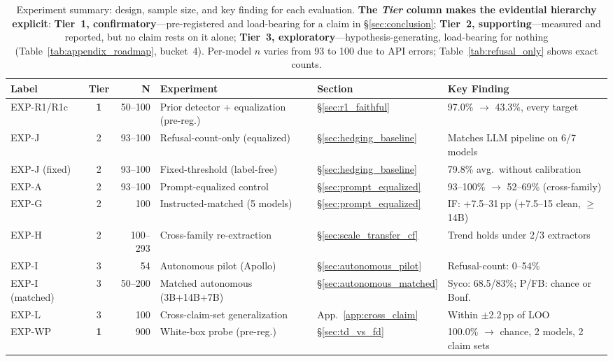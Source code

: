 \begin{table}[t]
\centering
\caption{Experiment summary: design, sample size, and key finding for each evaluation. \textbf{The \emph{Tier} column makes the evidential hierarchy explicit}: \textbf{Tier~1, confirmatory}---pre-registered and load-bearing for a claim in §\ref{sec:conclusion}; \textbf{Tier~2, supporting}---measured and reported, but no claim rests on it alone; \textbf{Tier~3, exploratory}---hypothesis-generating, load-bearing for nothing (Table~\ref{tab:appendix_roadmap}, bucket~4). Per-model $n$ varies from 93 to 100 due to API errors; Table~\ref{tab:refusal_only} shows exact counts.}
\label{tab:experiment_summary}
\begin{scriptsize}
\setlength{\tabcolsep}{2pt}
\begin{tabular}{lcrlll}
\toprule
\textbf{Label} & \textbf{Tier} & \textbf{N} & \textbf{Experiment} & \textbf{Section} & \textbf{Key Finding} \\
\midrule
EXP-R1/R1c & \textbf{1} & 50--100 & Prior detector + equalization (pre-reg.) & \S\ref{sec:r1_faithful} & 97.0\% $\to$ 43.3\%, every target \\
EXP-J & 2 & 93--100 & Refusal-count-only (equalized) & \S\ref{sec:hedging_baseline} & Matches LLM pipeline on 6/7 models \\
EXP-J (fixed) & 2 & 93--100 & Fixed-threshold (label-free) & \S\ref{sec:hedging_baseline} & 79.8\% avg.\ without calibration \\
EXP-A & 2 & 93--100 & Prompt-equalized control & \S\ref{sec:prompt_equalized} & 93--100\% $\to$ 52--69\% (cross-family) \\
EXP-G & 2 & 100 & Instructed-matched (5 models) & \S\ref{sec:prompt_equalized} & IF: +7.5--31\,pp (+7.5--15 clean, $\geq$14B) \\
EXP-H & 2 & 100--293 & Cross-family re-extraction & \S\ref{sec:scale_transfer_cf} & Trend holds under 2/3 extractors \\
EXP-I & 3 & 54 & Autonomous pilot (Apollo) & \S\ref{sec:autonomous_pilot} & Refusal-count: 0--54\% \\
EXP-I (matched) & 3 & 50--200 & Matched autonomous (3B+14B+7B) & \S\ref{sec:autonomous_matched} & Syco: 68.5/83\%; P/FB: chance or Bonf. \\
EXP-L & 3 & 100 & Cross-claim-set generalization & App.~\ref{app:cross_claim} & Within $\pm$2.2\,pp of LOO \\
EXP-WP & \textbf{1} & 900 & White-box probe (pre-reg.) & \S\ref{sec:td_vs_fd} & 100.0\% $\to$ chance, 2 models, 2 claim sets \\

\end{tabular}
\end{scriptsize}
\end{table}
